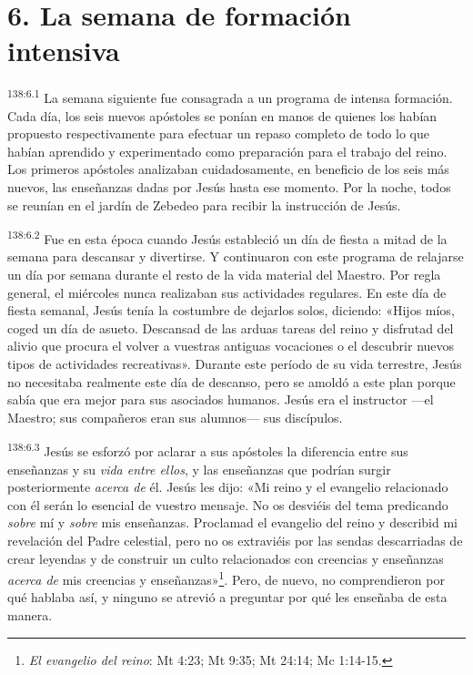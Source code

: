 \section*{6. La semana de formación intensiva}
\par 
\textsuperscript{138:6.1} La semana siguiente fue consagrada a un programa de intensa formación. Cada día, los seis nuevos apóstoles se ponían en manos de quienes los habían propuesto respectivamente para efectuar un repaso completo de todo lo que habían aprendido y experimentado como preparación para el trabajo del reino. Los primeros apóstoles analizaban cuidadosamente, en beneficio de los seis más nuevos, las enseñanzas dadas por Jesús hasta ese momento. Por la noche, todos se reunían en el jardín de Zebedeo para recibir la instrucción de Jesús.

\par 
\textsuperscript{138:6.2} Fue en esta época cuando Jesús estableció un día de fiesta a mitad de la semana para descansar y divertirse. Y continuaron con este programa de relajarse un día por semana durante el resto de la vida material del Maestro. Por regla general, el miércoles nunca realizaban sus actividades regulares. En este día de fiesta semanal, Jesús tenía la costumbre de dejarlos solos, diciendo: «Hijos míos, coged un día de asueto. Descansad de las arduas tareas del reino y disfrutad del alivio que procura el volver a vuestras antiguas vocaciones o el descubrir nuevos tipos de actividades recreativas». Durante este período de su vida terrestre, Jesús no necesitaba realmente este día de descanso, pero se amoldó a este plan porque sabía que era mejor para sus asociados humanos. Jesús era el instructor ---el Maestro; sus compañeros eran sus alumnos--- sus discípulos.

\par 
\textsuperscript{138:6.3} Jesús se esforzó por aclarar a sus apóstoles la diferencia entre sus enseñanzas y su \textit{vida entre ellos}, y las enseñanzas que podrían surgir posteriormente \textit{acerca de} él. Jesús les dijo: «Mi reino y el evangelio relacionado con él serán lo esencial de vuestro mensaje. No os desviéis del tema predicando \textit{sobre} mí y \textit{sobre} mis enseñanzas. Proclamad el evangelio del reino y describid mi revelación del Padre celestial, pero no os extraviéis por las sendas descarriadas de crear leyendas y de construir un culto relacionados con creencias y enseñanzas \textit{acerca de} mis creencias y enseñanzas»\footnote{\textit{El evangelio del reino}: Mt 4:23; Mt 9:35; Mt 24:14; Mc 1:14-15.}. Pero, de nuevo, no comprendieron por qué hablaba así, y ninguno se atrevió a preguntar por qué les enseñaba de esta manera.

